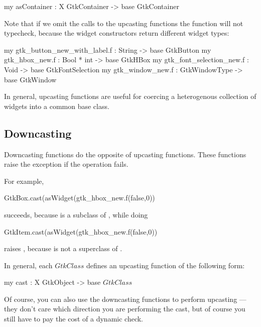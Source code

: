 \documentclass{article}
\begin{document}
   \begin{smldisp}
      my asContainer : X GtkContainer -> base GtkContainer
   \end{smldisp}

   Note that if we omit the calls to the upcasting functions 
   the function  will not
   typecheck, because the widget constructors return different widget types:

   \begin{smldisp}
     my gtk_button_new_with_label.f : String -> base GtkButton
     my gtk_hbox_new.f : Bool * int -> base GtkHBox
     my gtk_font_selection_new.f : Void -> base GtkFontSelection
     my gtk_window_new.f : GtkWindowType -> base GtkWindow
   \end{smldisp}

   In general, upcasting functions are useful for coercing a heterogenous
   collection of widgets into a common base class.  
 
\subsection{Downcasting}
 
   Downcasting functions do the opposite of upcasting functions.
   These functions raise the exception  
   if the operation fails.

   For example,

   \begin{smldisp}
     GtkBox.cast(asWidget(gtk_hbox_new.f(false,0))
   \end{smldisp}
   
   \noindent succeeds, because  is a subclass of , while
   doing 

   \begin{smldisp}
     GtkItem.cast(asWidget(gtk_hbox_new.f(false,0))
   \end{smldisp}

   \noindent 
     raises , because  is not a superclass
   of .

   In general, each $GtkClass$ defines an upcasting function
   of the following form:

   \begin{smldisp}
      my cast : X GtkObject -> base \(GtkClass\)
   \end{smldisp}

   Of course, you can also use the 
   downcasting functions to perform upcasting --- 
   they don't care which direction you are performing the cast, but 
   of course you still have to pay the cost of a dynamic check.
\end{document}
